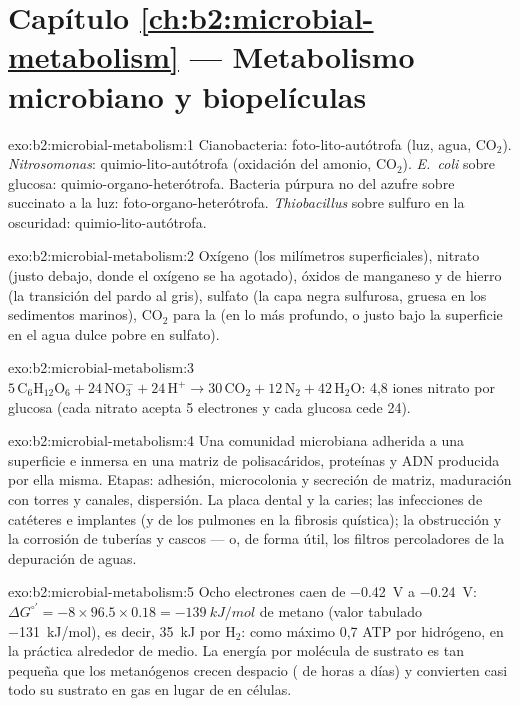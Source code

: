 \section*{Capítulo \ref{ch:b2:microbial-metabolism} --- Metabolismo microbiano y biopelículas}

\begin{solution}{exo:b2:microbial-metabolism:1}
Cianobacteria: foto-lito-autótrofa (luz, agua, $\mathrm{CO_2}$).
\emph{Nitrosomonas}: quimio-lito-autótrofa (oxidación del amonio,
$\mathrm{CO_2}$). \emph{E.~coli} sobre glucosa: quimio-organo-heterótrofa.
Bacteria púrpura no del azufre sobre succinato a la luz:
foto-organo-heterótrofa. \emph{Thiobacillus} sobre sulfuro en la
oscuridad: quimio-lito-autótrofa.
\end{solution}

\begin{solution}{exo:b2:microbial-metabolism:2}
Oxígeno (los milímetros superficiales), nitrato (justo debajo, donde el
oxígeno se ha agotado), óxidos de manganeso y de hierro (la transición
del pardo al gris), sulfato (la capa negra sulfurosa, gruesa en los
sedimentos marinos), $\mathrm{CO_2}$ para la  (en lo más
profundo, o justo bajo la superficie en el agua dulce pobre en sulfato).
\end{solution}

\begin{solution}{exo:b2:microbial-metabolism:3}
$5\,\mathrm{C_6H_{12}O_6} + 24\,\mathrm{NO_3^-} + 24\,\mathrm{H^+}
\to 30\,\mathrm{CO_2} + 12\,\mathrm{N_2} + 42\,\mathrm{H_2O}$: 4,8
iones nitrato por glucosa (cada nitrato acepta 5 electrones y cada
glucosa cede 24).
\end{solution}

\begin{solution}{exo:b2:microbial-metabolism:4}
Una comunidad microbiana adherida a una superficie e inmersa en una
matriz de polisacáridos, proteínas y ADN producida por ella misma.
Etapas: adhesión, microcolonia y secreción de matriz, maduración con
torres y canales, dispersión. La placa dental y la caries; las
infecciones de catéteres e implantes (y de los pulmones en la fibrosis
quística); la obstrucción y la corrosión de tuberías y cascos --- o,
de forma útil, los filtros percoladores de la depuración de aguas.
\end{solution}

\begin{solution}{exo:b2:microbial-metabolism:5}
Ocho electrones caen de \qty{-0.42}{V} a \qty{-0.24}{V}:
$\Delta G^{\circ\prime} = -8\times 96.5\times 0.18 =
\qty{-139}{kJ/mol}$ de metano (valor tabulado \qty{-131}{kJ/mol}), es
decir, \qty{35}{kJ} por $\mathrm{H_2}$: como máximo 0,7 ATP por
hidrógeno, en la práctica alrededor de medio. La energía por molécula de
sustrato es tan pequeña que los metanógenos crecen despacio ( de horas a días) y convierten casi todo su sustrato en gas
en lugar de en células.
\end{solution}


